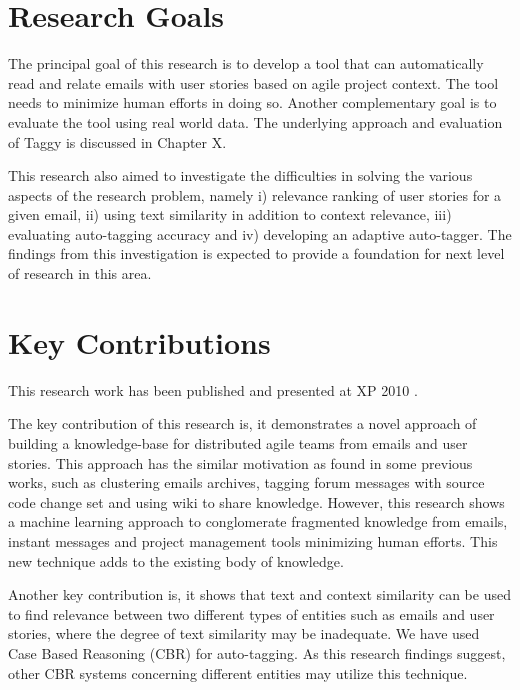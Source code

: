 \section{Research Goals}
The principal goal of this research is to develop a tool that can automatically read and relate emails with user stories based on agile project context. The tool needs to minimize human efforts in doing so. Another complementary goal is to evaluate the tool using real world data. The underlying approach and evaluation of Taggy is discussed in Chapter X.

This research also aimed to investigate the difficulties in solving the various aspects of the research problem, namely i) relevance ranking of user stories for a given email, ii) using text similarity in addition to context relevance, iii) evaluating auto-tagging accuracy and iv) developing an adaptive auto-tagger. The findings from this investigation is expected to provide a foundation for next level of research in this area.

\section{Key Contributions}
This research work has been published and presented at XP 2010 \cite{auto_tagging}. 

The key contribution of this research is, it demonstrates a novel approach of building a knowledge-base for distributed agile teams from emails and user stories. This approach has the similar motivation as found in some previous works, such as clustering emails archives\cite{required}, tagging forum messages with source code change set\cite{required} and using wiki to share knowledge. However, this research shows a machine learning approach to conglomerate fragmented knowledge from emails, instant messages and project management tools minimizing human efforts. This new technique adds to the existing body of knowledge.
                                  
Another key contribution is, it shows that text and context similarity can be used to find relevance between two different types of entities such as emails and user stories, where the degree of text similarity may be inadequate. We have used Case Based Reasoning (CBR) for auto-tagging. As this research findings suggest, other CBR systems concerning different entities may utilize this technique.
